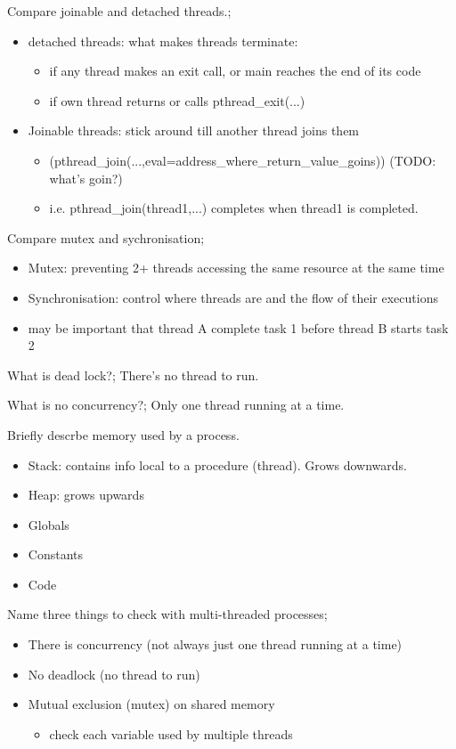 \documentclass{article}
\begin{document}
Compare joinable and detached threads.; \begin{itemize} \item detached threads: what makes threads terminate: \begin{itemize} \item if any thread makes an exit call, or main reaches the end of its code \item if own thread returns or calls pthread\_exit(...)  \end{itemize} \item Joinable threads: stick around till another thread joins them \begin{itemize} \item (pthread\_join(...,eval=address\_where\_return\_value\_goins)) (TODO: what's goin?) \item i.e. pthread\_join(thread1,...) completes when thread1 is completed.  \end{itemize} \end{itemize}

Compare mutex and sychronisation; \begin{itemize} \item Mutex: preventing 2+ threads accessing the same resource at the same time \item Synchronisation: control where threads are and the flow of their executions \item may be important that thread A complete task 1 before thread B starts task 2 \end{itemize}

What is dead lock?; There's no thread to run.

What is no concurrency?; Only one thread running at a time.

Briefly descrbe memory used by a process. \begin{itemize} \item Stack: contains info local to a procedure (thread). Grows downwards. \item Heap: grows upwards \item Globals \item Constants \item Code \end{itemize}

Name three things to check with multi-threaded processes; \begin{itemize} \item There is concurrency (not always just one thread running at a time) \item No deadlock (no thread to run) \item Mutual exclusion (mutex) on shared memory \begin{itemize} \item check each variable used by multiple threads \end{itemize} \end{itemize}
\end{document}
